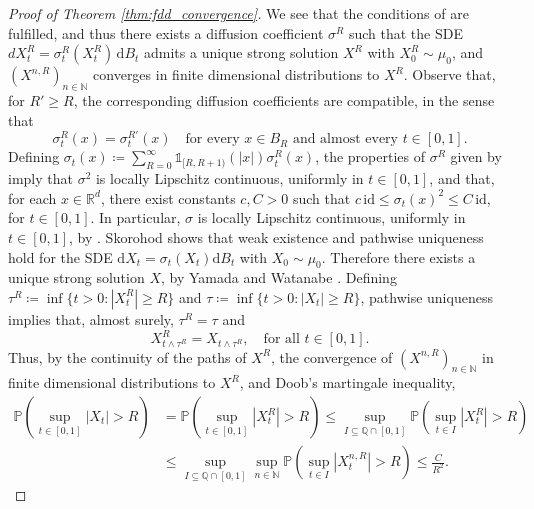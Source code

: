 \documentclass[12pt,oneside]{amsart}
\theoremstyle{definition}
\newcommand{\id}{\mathrm{id}}
\newcommand{\D}{\mathrm{d}}
\newcommand{\N}{\mathbb N}
\newcommand{\R}{\mathbb R}
\def\R{{\mathbb R}}
\numberwithin{equation}{section}
\begin{document}
\begin{proof}[Proof of Theorem \ref{thm:fdd_convergence}]
    We see that the conditions of  are fulfilled, and thus there exists a diffusion coefficient $\sigma^{R}$ such that the SDE $dX^R_t = \sigma_t^R(X^R_t) \, \D B_t$ admits a unique strong solution $X^R$ with $X^R_0 \sim \mu_0$, and $(X^{n,R})_{n \in \N}$ converges in finite dimensional distributions to $X^R$.
    Observe that, for $R' \ge R$, the corresponding diffusion coefficients are compatible, in the sense that
    \begin{equation}
        \sigma^{R}_t(x) = \sigma^{R'}_t(x) \quad \mbox{for every } x \in B_R \mbox{ and almost every } t\in [0,1].
    \end{equation}
    Defining $\sigma_t(x) \coloneqq \sum_{R = 0}^\infty \mathds 1_{[R,R+1)}(|x|) \sigma_t^R(x)$, the properties of $\sigma^R$ given by  imply that $\sigma^2$ is locally Lipschitz continuous, uniformly in $t \in [0,1]$, and that, for each $x \in \R^d$, there exist constants $c, C > 0$ such that $c\, \id \leq \sigma_t(x)^2 \leq C \, \id$, for $t \in [0, 1]$. In particular, $\sigma$ is locally Lipschitz continuous, uniformly in $t \in [0, 1]$, by . Skorohod \cite[Chapter 3, Section 3]{Sk65} shows that weak existence and pathwise uniqueness hold for the SDE $\D X_t = \sigma_t(X_t) \D B_t$ with $X_0 \sim \mu_0$. Therefore there exists a unique strong solution $X$, by Yamada and Watanabe \cite[Corollary 1]{YW}.
    Defining $\tau^R \coloneqq \inf \{ t > 0 \colon |X^R_t| \ge R \}$ and $\tau \coloneqq \inf \{ t > 0 \colon |X_t| \geq R\}$, pathwise uniqueness implies that, almost surely, $\tau^R = \tau$ and
    \begin{equation}
        \label{eq:thm_ffd_convergence_XR_X}
        X^R_{t \wedge \tau^R} = X_{t \wedge \tau^R}, \quad \text{for all } t \in [0,1].
    \end{equation}
    Thus, by the continuity of the paths of $X^R$, the convergence of $(X^{n,R})_{n \in \N}$ in finite dimensional distributions to $X^R$, and Doob's martingale inequality,
    \begin{align}
        \mathbb P \!\left( \sup_{t \in [0,1]} |X_t| > R \right)\!
        &= 
        \mathbb P\!\left( \sup_{t \in [0,1]} |X_t^R| > R \right)\!
        \leq \sup_{I \subseteq \mathbb Q \cap [0,1]}
        \mathbb P\!\left( \sup_{t \in I} |X_t^R| > R \right)\!
        \\
        &\le
        \sup_{I \subseteq \mathbb Q \cap [0,1]} \sup_{n \in \N} \mathbb P \!\left( \sup_{t \in I} |X_t^{n,R}| > R \right)\!
        \le \frac{C}{R^2}.

\end{align}
\end{proof}
\end{document}
